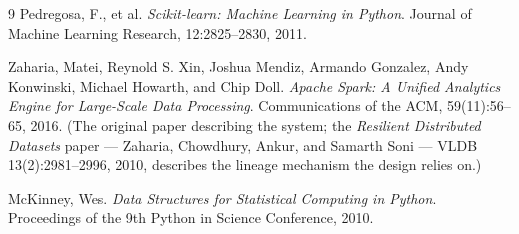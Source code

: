 \documentclass[sigconf,balance=false]{acmart}
\begin{document}
\begin{thebibliography}{9}
Pedregosa, F., et al.
\newblock \emph{Scikit-learn: Machine Learning in Python}.
\newblock Journal of Machine Learning Research, 12:2825--2830, 2011.

Zaharia, Matei, Reynold S. Xin, Joshua Mendiz, Armando Gonzalez, Andy
  Konwinski, Michael Howarth, and Chip Doll.
\newblock \emph{Apache Spark: A Unified Analytics Engine for Large-Scale
  Data Processing}.
\newblock Communications of the ACM, 59(11):56--65, 2016.
\newblock (The original paper describing the system; the
  \emph{Resilient Distributed Datasets} paper --- Zaharia, Chowdhury,
  Ankur, and Samarth Soni --- VLDB 13(2):2981--2996, 2010, describes the
  lineage mechanism the design relies on.)

McKinney, Wes.
\newblock \emph{Data Structures for Statistical Computing in Python}.
\newblock Proceedings of the 9th Python in Science Conference, 2010.

\end{thebibliography}

\appendix

\enlargethispage{-4pt}

\newpage
\end{document}
